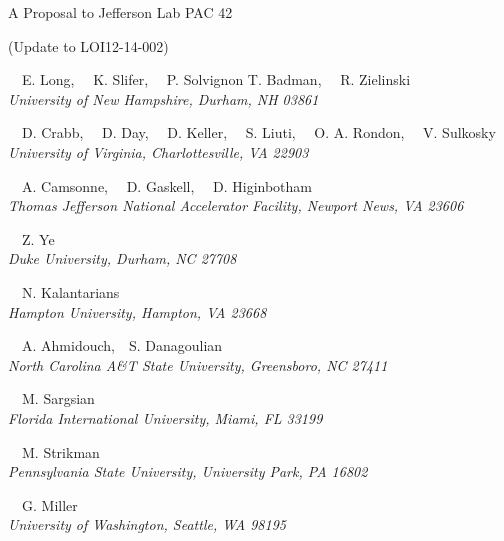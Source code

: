 \begin{center}
A Proposal to Jefferson Lab PAC 42

(Update to LOI12-14-002)

\vspace{1.5cm}

\setcounter{footnote}{\SPOKES}
%
{~~E. Long,\setcounter{footnote}{\SPOKES}
\setcounter{footnote}{\SPOKES}\footnotemark {}
\setcounter{footnote}{\CONTACT}\footnotemark{}
~~K. Slifer,\setcounter{footnote}{\SPOKES}\footnotemark
~~P. Solvignon\setcounter{footnote}{\SPOKES}\footnotemark
T. Badman,
~~R. Zielinski
}\\
\ls
{\normalsize\it{University of New Hampshire, Durham, NH 03861}}

\vspace{10px}

{~~D. Crabb,
~~D. Day,\setcounter{footnote}{\SPOKES}\footnotemark
~~D. Keller,\setcounter{footnote}{\SPOKES}\footnotemark
~~S. Liuti,
~~O. A. Rondon,
~~V. Sulkosky}\\
\ls
{\normalsize\it{University of Virginia, Charlottesville, VA 22903}}

\vspace{10px}

{~~A. Camsonne,
~~D. Gaskell,
~~D. Higinbotham\setcounter{footnote}{\SPOKES}\footnotemark}\\
\ls
{\normalsize\it{Thomas Jefferson National Accelerator Facility, Newport News, VA 23606}}

\vspace{10px}

{~~Z. Ye}\\
\ls
{\normalsize\it{Duke University, Durham, NC 27708}}

\vspace{10px}

{~~N. Kalantarians}\\
\ls
{\normalsize\it{Hampton University, Hampton, VA 23668}}

\vspace{10px}

{~~A. Ahmidouch,~~S. Danagoulian}\\
\ls
{\normalsize\it{North Carolina A\&T State University, Greensboro, NC 27411}}

\vspace{10px}

{~~M. Sargsian}\\
\ls
{\normalsize\it{Florida International University, Miami, FL 33199}}

\vspace{10px}

{~~M. Strikman}\\
\ls
{\normalsize\it{Pennsylvania State University, University Park, PA 16802}}

\vspace{10px}

{~~G. Miller}\\
\ls
{\normalsize\it{University of Washington, Seattle, WA 98195}}
\ks
%

\end{center}


\setcounter{footnote}{0}
